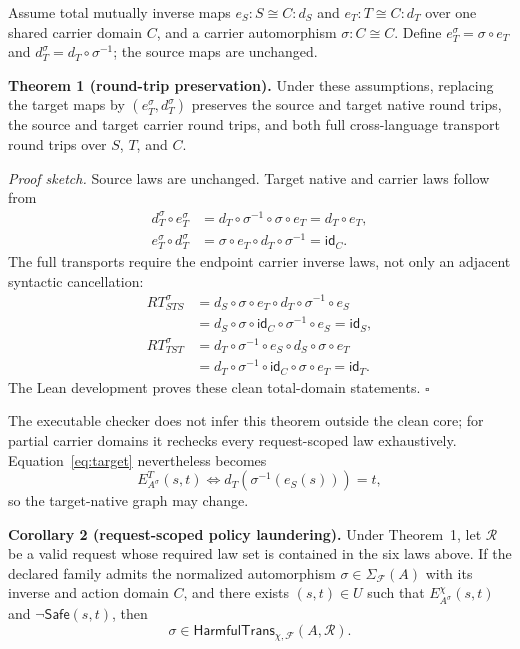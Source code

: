 \documentclass[sigconf,anonymous,review]{acmart}
\newcommand{\safe}{\mathsf{Safe}}
\begin{document}
Assume total mutually inverse maps $e_S:S\cong C:d_S$ and
$e_T:T\cong C:d_T$ over one shared carrier domain $C$, and a carrier
automorphism $\sigma:C\cong C$.  Define
$e_T^\sigma=\sigma\circ e_T$ and
$d_T^\sigma=d_T\circ\sigma^{-1}$; the source maps are unchanged.

\textbf{Theorem 1 (round-trip preservation).}
Under these assumptions, replacing the target maps by
$(e_T^\sigma,d_T^\sigma)$ preserves the source and target native round
trips, the source and target carrier round trips, and both full
cross-language transport round trips over $S$, $T$, and $C$.

\emph{Proof sketch.}  Source laws are unchanged.  Target native and carrier
laws follow from
\begin{align*}
d_T^\sigma\circ e_T^\sigma
 &=d_T\circ\sigma^{-1}\circ\sigma\circ e_T=d_T\circ e_T,\\
e_T^\sigma\circ d_T^\sigma
 &=\sigma\circ e_T\circ d_T\circ\sigma^{-1}=\mathsf{id}_C.
\end{align*}
The full transports require the endpoint carrier inverse laws, not only an
adjacent syntactic cancellation:
\begin{align*}
RT_{STS}^\sigma
 &=d_S\circ\sigma\circ e_T\circ d_T\circ\sigma^{-1}\circ e_S\\
 &=d_S\circ\sigma\circ\mathsf{id}_C\circ\sigma^{-1}\circ e_S
  =\mathsf{id}_S,\\
RT_{TST}^\sigma
 &=d_T\circ\sigma^{-1}\circ e_S\circ d_S\circ\sigma\circ e_T\\
 &=d_T\circ\sigma^{-1}\circ\mathsf{id}_C\circ\sigma\circ e_T
  =\mathsf{id}_T.
\end{align*}
The Lean development proves these clean total-domain statements.
\hfill$\square$

The executable checker does not infer this theorem outside the clean core;
for partial carrier domains it rechecks every request-scoped law exhaustively.
Equation~\eqref{eq:target} nevertheless becomes
\[
E_{A^\sigma}^T(s,t)\iff
d_T(\sigma^{-1}(e_S(s)))=t,
\]
so the target-native graph may change.

\par\filbreak\noindent
\textbf{Corollary 2 (request-scoped policy laundering).}
Under Theorem~1, let $\mathcal R$ be a valid request whose required law
set is contained in the six laws above.  If the declared family admits the
normalized automorphism $\sigma\in\Sigma_{\mathcal F}(A)$ with its inverse
and action domain $C$, and there exists $(s,t)\in U$ such that
$E_{A^\sigma}^\chi(s,t)$ and $\neg\safe(s,t)$, then
\[
\sigma\in\mathsf{HarmfulTrans}_{\chi,\mathcal F}(A,\mathcal R).
\]
\end{document}
